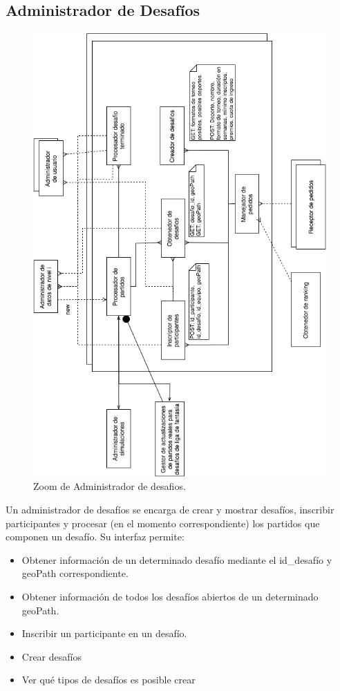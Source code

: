 \subsection{Administrador de Desafíos}

\begin{figure}[H]
   \centering
   \includegraphics[height=0.95\textheight]{reentrega/imagenes/desafios-1.png}
   \caption{Zoom de Administrador de desafios.}
\end{figure}

Un administrador de desafíos se encarga de crear y mostrar desafíos, inscribir participantes y procesar (en el momento correspondiente) los partidos que componen un desafío.
Su interfaz permite:
\begin{itemize}
	\item Obtener información de un determinado desafío mediante el id_desafío y geoPath correspondiente.
	\item Obtener información de todos los desafíos abiertos de un determinado geoPath.
	\item Inscribir un participante en un desafío.
	\item Crear desafíos
	\item Ver qué tipos de desafíos es posible crear
\end{itemize}


